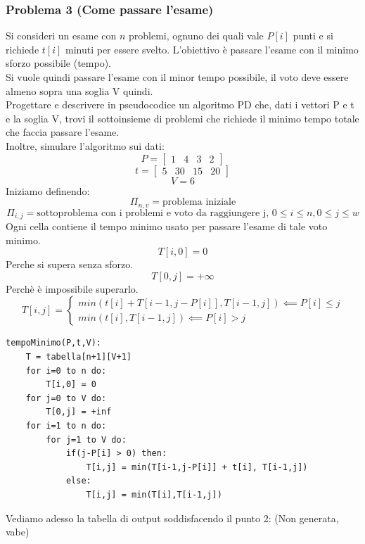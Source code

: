\documentclass[a4paper,12pt]{article}
\begin{document}
\subsubsection{Problema 3 (Come passare l'esame)}
Si consideri un esame con $n$ problemi, ognuno dei quali vale $P[i]$ punti e si richiede $t[i]$ minuti per essere svelto. L'obiettivo è passare l'esame con il minimo sforzo possibile (tempo).\\
Si vuole quindi passare l'esame con il minor tempo possibile, il voto deve essere almeno sopra una soglia V quindi.\\
Progettare e descrivere in pseudocodice un algoritmo PD che, dati i vettori P e t e la soglia V, trovi il sottoinsieme di problemi che richiede il minimo tempo totale che faccia passare l'esame.\\
Inoltre, simulare l'algoritmo sui dati:
\[
P = \begin{bmatrix}
    1 & 4 & 3 & 2
\end{bmatrix}
\]
\[
t = \begin{bmatrix}
    5 & 30 & 15 & 20
\end{bmatrix}
\]
\[
V = 6
\]
Iniziamo definendo:
\[
\Pi_{n,v} = \text{problema iniziale}
\]
\[
\Pi_{i,j} = \text{sottoproblema con i problemi e voto da raggiungere j, }0 \leq i \leq n, 0 \leq j \leq w
\]
Ogni cella contiene il tempo minimo usato per passare l'esame di tale voto minimo.
\[
T[i,0] = 0
\]
Perche si supera senza sforzo.
\[
T[0,j] = +\infty
\]
Perchè è impossibile superarlo.
\[
T[i,j] = \begin{cases}
    min(t[i] + T[i-1,j-P[i]], T[i-1,j]) \impliedby P[i] \leq j\\
    min(t[i],T[i-1,j]) \impliedby P[i] > j
\end{cases}
\]
\begin{lstlisting}
tempoMinimo(P,t,V):
    T = tabella[n+1][V+1]
    for i=0 to n do:
        T[i,0] = 0
    for j=0 to V do:
        T[0,j] = +inf
    for i=1 to n do:
        for j=1 to V do:
            if(j-P[i] > 0) then:
                T[i,j] = min(T[i-1,j-P[i]] + t[i], T[i-1,j])
            else:
                T[i,j] = min(T[i],T[i-1,j])
\end{lstlisting}
Vediamo adesso la tabella di output soddisfacendo il punto 2: (Non generata, vabe)
\end{document}
